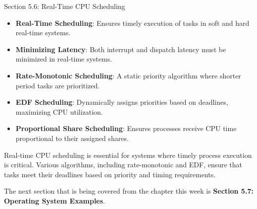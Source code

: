 \begin{notes}{Section 5.6: Real-Time CPU Scheduling}
\begin{highlight}
    \end{highlight}
    
    \begin{highlight}
    
        \begin{itemize}
            \item \textbf{Real-Time Scheduling}: Ensures timely execution of tasks in soft and hard real-time systems.
            \item \textbf{Minimizing Latency}: Both interrupt and dispatch latency must be minimized in real-time systems.
            \item \textbf{Rate-Monotonic Scheduling}: A static priority algorithm where shorter period tasks are prioritized.
            \item \textbf{EDF Scheduling}: Dynamically assigns priorities based on deadlines, maximizing CPU utilization.
            \item \textbf{Proportional Share Scheduling}: Ensures processes receive CPU time proportional to their assigned shares.
        \end{itemize}
    
    Real-time CPU scheduling is essential for systems where timely process execution is critical. Various algorithms, including rate-monotonic and EDF, ensure that tasks meet their deadlines based on priority 
    and timing requirements.
    
    \end{highlight}
\end{notes}

The next section that is being covered from the chapter this week is \textbf{Section 5.7: Operating System Examples}.


